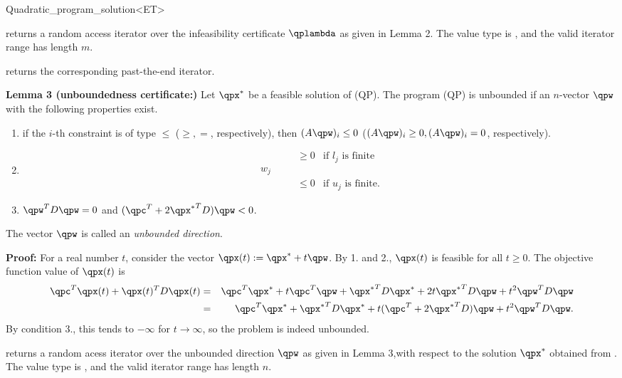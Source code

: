 \begin{ccRefClass}{Quadratic_program_solution<ET>}
\begin{ccAdvanced}
{returns a random access iterator over the infeasibility certificate 
$\qplambda$ as given in Lemma 2. The value type
is , and the valid iterator range has length $m$.
\ccPrecond \ccVar{}}

{returns the corresponding past-the-end iterator.}

\ccExample
{}

{\bf Lemma 3 (unboundedness certificate:)} Let $\qpx^*$ be a feasible
solution of (QP). The program (QP) is unbounded if an $n$-vector 
$\qpw$ with the following properties exist.
\begin{enumerate}
\item if the $i$-th constraint is of type $\leq$ ($\geq, =$, respectively),
then $(A\qpw)_i\leq 0$ ($(A\qpw)_i\geq 0, (A\qpw)_i=0$, respectively).
\item 
\[
\begin{array}{llll}
&&\geq 0 & \mbox{if $l_j$ is finite} \\
w_j &\quad  \\
&&\leq 0 & \mbox{if $u_j$ is finite.}
\end{array}
\]
\item $\qpw^TD\qpw=0$ and $(\qpc^T+2{\qpx^*}^TD)\qpw<0$.
\end{enumerate}

The vector $\qpw$ is called an \emph{unbounded direction}.

{\bf Proof:} For a real number $t$, consider the vector $\qpx(t):=\qpx^*+t\qpw$. By 1.
and 2., $\qpx(t)$ is feasible for all $t\geq 0$. The objective function value
of $\qpx(t)$ is
\begin{eqnarray*}
\qpc^T \qpx(t) + \qpx(t)^TD \qpx(t) &=& 
\qpc^T\qpx^* + t\qpc^T\qpw + {\qpx^*}^TD\qpx^* +  2t{\qpx^*}^TD\qpw + t^2 \qpw^TD\qpw  \\
&=& \qpc^T\qpx^* + {\qpx^*}^TD\qpx^* + t(\qpc^T + 2{\qpx^*}^TD)\qpw + t^2\qpw^TD\qpw.
\end{eqnarray*}
By condition 3., this tends to $-\infty$ for $t\rightarrow\infty$, so
the problem is indeed unbounded. 

{returns a random acess iterator over the unbounded direction $\qpw$
as given in Lemma 3,with respect to the solution $\qpx^*$ 
obtained from \ccVar{}. The value type
is , and the valid iterator range has length $n$.
\ccPrecond \ccVar{}}


\end{ccAdvanced}
\end{ccRefClass}
